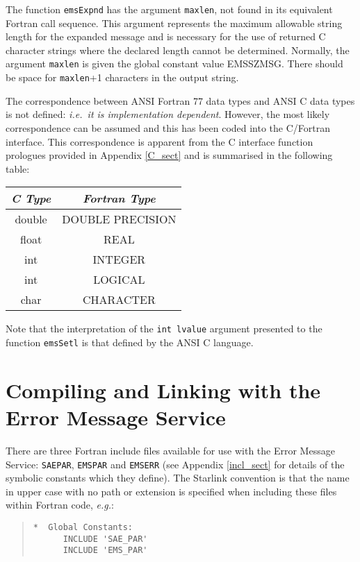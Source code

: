 \documentclass[twoside,11pt]{article}
\newcommand{\xlabel}[1]{}
\renewcommand{\_}{\texttt{\symbol{95}}}
\begin{document}
The function \texttt{emsExpnd} has the argument \texttt{maxlen}, not found in
its equivalent Fortran call sequence.
This argument represents the maximum allowable string length for the expanded
message and is necessary for the use of returned C character strings where the
declared length cannot be determined.
Normally, the argument \texttt{maxlen} is given the global constant value
EMS\_\_SZMSG. There should be space for \texttt{maxlen}+1 characters in the
output string.

The correspondence between ANSI Fortran 77 data types and ANSI C data types
is not defined: \textit{i.e.\ it is implementation dependent}.
However, the most likely correspondence can be assumed and this has been coded
into the C/Fortran interface.
This correspondence is apparent from the C interface function prologues
provided in Appendix \ref{C_sect} and is summarised in the following table:

\begin {center}
\begin {tabular}{||c|c||}
\hline
\textit{C Type} & \textit{Fortran Type}\\
\hline
double & DOUBLE PRECISION\\
float & REAL\\
int & INTEGER\\
int & LOGICAL\\
char & CHARACTER\\
\hline
\end {tabular}
\end {center}

Note that the interpretation of the \texttt{int lvalue} argument presented to 
the function \texttt{emsSetl} is that defined by the ANSI C language.

\section{\xlabel{compiling_and_linking_with_the_error_message_service}Compiling
and Linking with the Error Message Service}\label{comp_sect}

There are three Fortran include files available for use with the Error Message 
Service: \texttt{SAE\_PAR}, \texttt{EMS\_PAR} and \texttt{EMS\_ERR}
(see Appendix \ref{incl_sect} for details of the symbolic constants which they 
define).
The Starlink convention is that the name in upper case with no path or
extension is specified when including these files within Fortran code,
\textit{e.g.}:
\begin{quote}
\begin{verbatim}
*  Global Constants:
      INCLUDE 'SAE_PAR'
      INCLUDE 'EMS_PAR'
\end{verbatim}
\end{quote}
\end{document}
